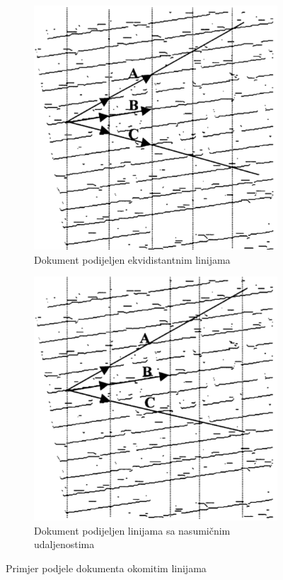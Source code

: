 \documentclass[times, utf8, zavrsni, numeric]{fer}
\begin{document}
\begin{figure}[th!]
    \centering
    \begin{subfigure}{.5\textwidth}
        \centering
        \includegraphics[width=.85\linewidth]{Images/Skew_equidistant.png}
        \captionsetup{justification=centering}
        \caption{Dokument podijeljen ekvidistantnim linijama\cite{article:Skew-detection}}
        \label{fig:skew_equidistant}
    \end{subfigure}%
    \begin{subfigure}{.5\textwidth}
        \centering
        \includegraphics[width=.85\linewidth]{Images/Skew_random.png}
        \captionsetup{justification=centering}
        \caption{Dokument podijeljen linijama sa nasumičnim udaljenostima\cite{article:Skew-detection}}
        \label{fig:skwe_random}
    \end{subfigure}
    \caption{Primjer podjele dokumenta okomitim linijama}
    \label{fig:skew_verticalLines}
\end{figure}
\end{document}
